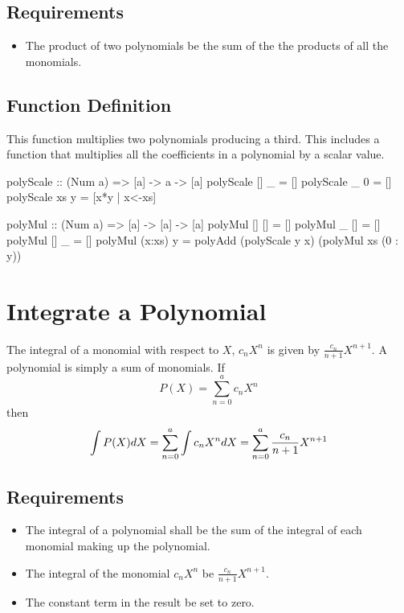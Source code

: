 \subsection{Requirements}
\begin{itemize}
\item The product of two polynomials  be the sum of the the products of all the monomials.
\end{itemize}

\subsection{Function Definition}
This function multiplies two polynomials producing a third.  This includes a function that multiplies all the coefficients in a polynomial by a scalar value.
\begin{code}
polyScale :: (Num a) => [a] -> a -> [a]
polyScale [] _ = []
polyScale _ 0  = []
polyScale xs y = [x*y | x<-xs]

polyMul :: (Num a) => [a] -> [a] -> [a]
polyMul [] [] = []
polyMul _ []  = []
polyMul [] _  = []
polyMul (x:xs) y = polyAdd (polyScale y x) (polyMul xs (0 : y))
\end{code}

\section{Integrate a Polynomial}
The integral of a monomial with respect to $X$, $c_{n}X^n$ is given by $\frac{c_n}{n+1}X^{n+1}$.  A polynomial is simply a sum of monomials.  If
\[
P(X) = \sum_{n = 0}^{a} c_nX^n
\]
then
\[
\int P(X) dX = \sum_{n = 0}^{a}\int c_nX^n dX\\
= \sum_{n = 0}^{a} \frac{c_n}{n + 1}X^{n+1}
\]

\subsection{Requirements}
\begin{itemize}
\item The integral of a polynomial  shall be the sum of the integral of each monomial making up the polynomial.
\item The integral of the monomial $c_{n}X^n$  be $\frac{c_{n}}{n+1}X^{n+1}$.
\item The constant term in the result  be set to zero.
\end{itemize}

